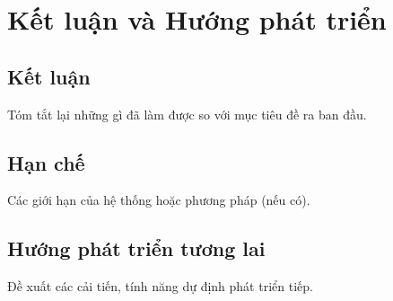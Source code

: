 
\chapter*{Kết luận và Hướng phát triển}

\section*{Kết luận}
Tóm tắt lại những gì đã làm được so với mục tiêu đề ra ban đầu.

\section*{Hạn chế}
Các giới hạn của hệ thống hoặc phương pháp (nếu có).

\section*{Hướng phát triển tương lai}
Đề xuất các cải tiến, tính năng dự định phát triển tiếp.
